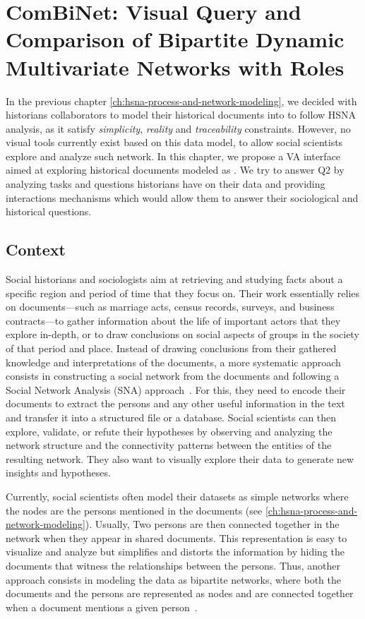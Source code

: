 \chapter{ComBiNet: Visual Query and Comparison of Bipartite Dynamic Multivariate Networks with Roles}

In the previous chapter \autoref{ch:hsna-process-and-network-modeling}, we decided with historians collaborators to model their historical documents into \modelplural to follow HSNA analysis, as it satisfy \emph{simplicity}, \emph{reality} and \emph{traceability} constraints.
However, no visual tools currently exist based on this data model, to allow social scientists explore and analyze such network.
In this chapter, we propose a VA interface aimed at exploring historical documents modeled as \modelplural.
We try to answer Q2 by analyzing tasks and questions historians have on their data and providing interactions mechanisms which would allow them to answer their sociological and historical questions.


\section{Context}

Social historians and sociologists aim at retrieving and studying facts about a specific region and period of time that they focus on.
Their work essentially relies on documents---such as marriage acts, census records, surveys, and business contracts---to gather information about the life of important actors that they explore in-depth, or to draw conclusions on social aspects of groups in the society of that period and place.
Instead of drawing conclusions from their gathered knowledge and interpretations of the documents, a more systematic approach consists in constructing a social network from the documents and following a Social Network Analysis (SNA) approach~\cite{wetherellHistoricalSocialNetwork1998}.
For this, they need to encode their documents to extract the persons and any other useful information in the text and transfer it into a structured file or a database.
Social scientists can then explore, validate, or refute their hypotheses by observing and analyzing the network structure and the connectivity patterns between the entities of the resulting network.
They also want to visually explore their data to generate new insights and hypotheses.

Currently, social scientists often model their datasets as simple networks where the nodes are the persons mentioned in the documents (see \autoref{ch:hsna-process-and-network-modeling}).
Usually, Two persons are then connected together in the network when they appear in shared documents.
This representation is easy to visualize and analyze but simplifies and distorts the information by hiding the documents that witness the relationships between the persons.
Thus, another approach consists in modeling the data as bipartite networks, where both the documents and the persons are represented as nodes and are connected together when a document mentions a given person~\cite{grandjeanAnalisiVisualizzazioniReti2017, rossiExplorationLargeDatabase2014, shafieHypergraphRepresentationsStudy2017}.

